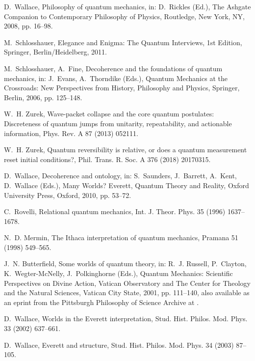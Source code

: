 \documentclass[3p,sort&compress,12pt]{elsarticle}
\begin{document}
\begin{thebibliography}{100}
D.~Wallace, Philosophy of quantum mechanics, in: D.~Rickles (Ed.), The Ashgate
  Companion to Contemporary Philosophy of Physics, Routledge, New York, NY,
  2008, pp. 16--98.

M.~Schlosshauer, Elegance and Enigma: The Quantum Interviews, 1st Edition,
  Springer, Berlin/Heidelberg, 2011.

M.~Schlosshauer, A.~Fine, Decoherence and the foundations of quantum mechanics,
  in: J.~Evans, A.~Thorndike (Eds.), Quantum Mechanics at the Crossroads: New
  Perspectives from History, Philosophy and Physics, Springer, Berlin, 2006,
  pp. 125--148.

W.~H. Zurek, Wave-packet collapse and the core quantum postulates:
  {D}iscreteness of quantum jumps from unitarity, repeatability, and actionable
  information, Phys. Rev. A 87 (2013) 052111.

W.~H. Zurek, Quantum reversibility is relative, or does a quantum measurement
  reset initial conditions?, Phil. Trans. R. Soc. A 376 (2018) 20170315.

D.~Wallace, Decoherence and ontology, in: S.~Saunders, J.~Barrett, A.~Kent,
  D.~Wallace (Eds.), Many Worlds? {E}verett, Quantum Theory and Reality, Oxford
  University Press, Oxford, 2010, pp. 53--72.

C.~Rovelli, Relational quantum mechanics, Int. J. Theor. Phys. 35 (1996)
  1637--1678.

N.~D. Mermin, The {I}thaca interpretation of quantum mechanics, Pramana 51
  (1998) 549--565.

J.~N. Butterfield, Some worlds of quantum theory, in: R.~J. Russell,
  P.~Clayton, K.~Wegter-McNelly, J.~Polkinghorne (Eds.), Quantum Mechanics:
  Scientific Perspectives on Divine Action, Vatican Observatory and The Center
  for Theology and the Natural Sciences, Vatican City State, 2001, pp.
  111--140, also available as an eprint from the Pittsburgh Philosophy of
  Science Archive at \href{http://philsci-archive.pitt.edu/archive/00000203}{}.

D.~Wallace, Worlds in the {E}verett interpretation, Stud. Hist. Philos. Mod.
  Phys. 33 (2002) 637--661.

D.~Wallace, Everett and structure, Stud. Hist. Philos. Mod. Phys. 34 (2003)
  87--105.


\end{thebibliography}
\end{document}
